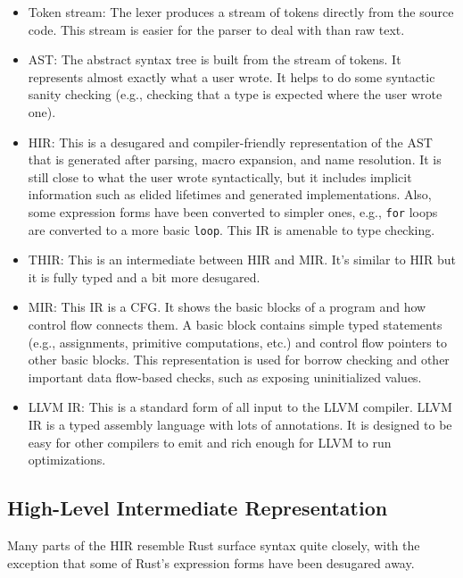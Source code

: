 \documentclass[paper=a4,%
  twoside,%
  BCOR4mm,%
  abstract=true,%
  toc=bibliography,%
  chapterprefix=true,%
  toc=bibliographynumbered,%
  open=right,%
  english,%
  pagesize=pdftex]{scrreprt}
\newcommand{\hir}{\ac{HIR}\xspace}
\newcommand{\mir}{\ac{MIR}\xspace}
\newcommand{\cfg}{\ac{CFG}\xspace}
\begin{document}
\begin{itemize}
    \item Token stream: The lexer produces a stream of tokens directly from the source code. This stream is easier for the parser to deal with than raw text.
    \item \ac{AST}: The abstract syntax tree is built from the stream of tokens. It represents almost exactly what a user wrote. It helps to do some syntactic sanity checking (e.g., checking that a type is expected where the user wrote one).
    \item \hir: This is a desugared and compiler-friendly representation of the \ac{AST} that is generated after parsing, macro expansion, and name resolution. It is still close to what the user wrote syntactically, but it includes implicit information such as elided lifetimes and generated implementations. Also, some expression forms have been converted to simpler ones, e.g., \texttt{for} loops are converted to a more basic \texttt{loop}. This \ac{IR} is amenable to type checking.
    \item \ac{THIR}: This is an intermediate between \hir and \mir. It's similar to \hir but it is fully typed and a bit more desugared.
    \item \mir: This \ac{IR} is a \cfg. It shows the basic blocks of a program and how control flow connects them. A basic block contains simple typed statements (e.g., assignments, primitive computations, etc.) and control flow pointers to other basic blocks. This representation is used for borrow checking and other important data flow-based checks, such as exposing uninitialized values.
    \item LLVM \ac{IR}: This is a standard form of all input to the LLVM compiler. LLVM \ac{IR} is a typed assembly language with lots of annotations. It is designed to be easy for other compilers to emit and rich enough for LLVM to run optimizations.
\end{itemize}

\subsection{High-Level Intermediate Representation}
Many parts of the \hir resemble Rust surface syntax quite closely, with the exception that some of Rust's expression forms have been desugared away.
\end{document}
